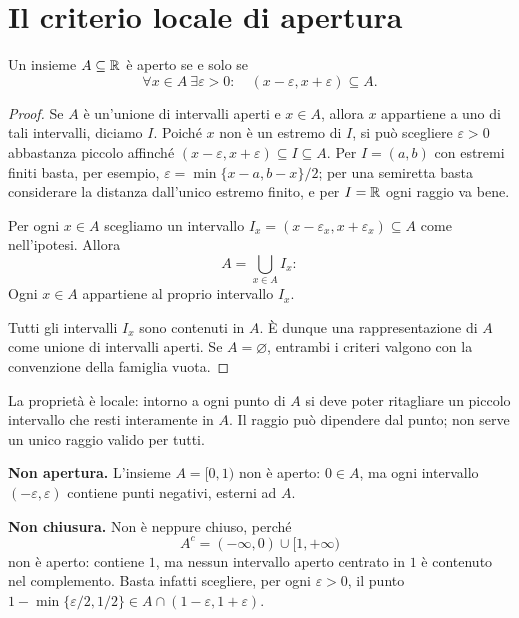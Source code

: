 \section{Il criterio locale di apertura}

\begin{proposizione}
\label{prop:aperti-criterio}
Un insieme $A\subseteq\mathbb{R}$ è aperto se e solo se
\[
\forall x\in A\ \exists\varepsilon>0:
\quad (x-\varepsilon,x+\varepsilon)\subseteq A.
\]
\end{proposizione}
\begin{proof}
\passomath{\Rightarrow} Se $A$ è un'unione di intervalli aperti e $x\in A$, allora $x$ appartiene a uno di tali intervalli, diciamo $I$. Poiché $x$ non è un estremo di $I$, si può scegliere $\varepsilon>0$ abbastanza piccolo affinché $(x-\varepsilon,x+\varepsilon)\subseteq I\subseteq A$. Per $I=(a,b)$ con estremi finiti basta, per esempio, $\varepsilon=\min\{x-a,b-x\}/2$; per una semiretta basta considerare la distanza dall'unico estremo finito, e per $I=\mathbb{R}$ ogni raggio va bene.

\passomath{\Leftarrow} Per ogni $x\in A$ scegliamo un intervallo $I_x=(x-\varepsilon_x,x+\varepsilon_x)\subseteq A$ come nell'ipotesi. Allora
\[
A=\bigcup_{x\in A}I_x:
\]
 Ogni $x\in A$ appartiene al proprio intervallo $I_x$.

 Tutti gli intervalli $I_x$ sono contenuti in $A$. È dunque una rappresentazione di $A$ come unione di intervalli aperti. Se $A=\varnothing$, entrambi i criteri valgono con la convenzione della famiglia vuota.
\end{proof}

La proprietà è locale: intorno a ogni punto di $A$ si deve poter ritagliare un piccolo intervallo che resti interamente in $A$. Il raggio può dipendere dal punto; non serve un unico raggio valido per tutti.

\begin{esempio}
\textbf{Non apertura.} L'insieme $A=[0,1)$ non è aperto: $0\in A$, ma ogni intervallo $(-\varepsilon,\varepsilon)$ contiene punti negativi, esterni ad $A$.

\textbf{Non chiusura.} Non è neppure chiuso, perché
\[
A^c=(-\infty,0)\cup[1,+\infty)
\]
non è aperto: contiene $1$, ma nessun intervallo aperto centrato in $1$ è contenuto nel complemento. Basta infatti scegliere, per ogni $\varepsilon>0$, il punto $1-\min\{\varepsilon/2,1/2\}\in A\cap(1-\varepsilon,1+\varepsilon)$.
\end{esempio}
